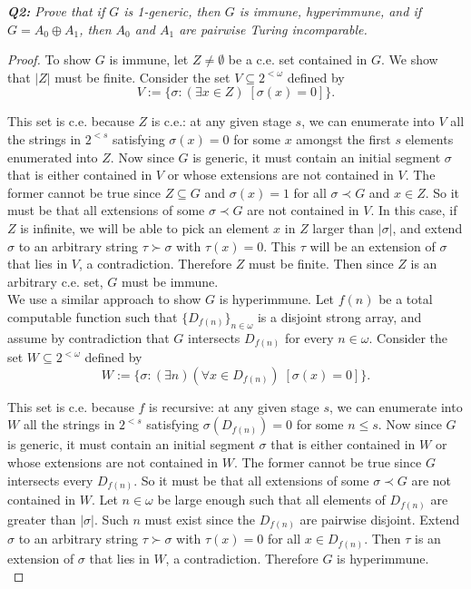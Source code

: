 \documentclass{article}
\begin{document}
\it \textbf{Q2:} Prove that if $G$ is 1-generic, then $G$ is immune,
  hyperimmune, and if $G=A_0\oplus A_1$, then $A_0$ and $A_1$ are pairwise
  Turing incomparable.

  \begin{proof}
    To show $G$ is immune, let $Z\neq\emptyset$ be a c.e. set contained in
    $G$. We show that $|Z|$ must be finite. Consider the set $V\subseteq
    2^{<\omega}$ defined by
    \[V:= \{\sigma: (\exists x\in Z)\; [\sigma(x)=0]\}.\]

    This set is c.e. because $Z$ is c.e.: at any given stage $s$, we can
    enumerate into $V$ all the strings in $2^{<s}$ satisfying $\sigma(x)=0$
    for some $x$ amongst the first $s$ elements enumerated into $Z$. Now
    since $G$ is generic, it must contain an initial segment $\sigma$
    that is either contained in $V$ or whose extensions are not
    contained in $V$. The former cannot be true since $Z\subseteq G$ and
    $\sigma(x)=1$ for all $\sigma\prec G$ and $x\in Z$. So it must be
    that all extensions of some $\sigma\prec G$ are not contained in $V$. In
    this case, if $Z$ is infinite, we will be able to pick an element $x$
    in $Z$ larger than $|\sigma|$, and extend $\sigma$ to an arbitrary
    string $\tau\succ\sigma$ with $\tau(x)=0$. This $\tau$ will be an
    extension of $\sigma$ that lies in $V$, a contradiction. Therefore $Z$
    must be finite. Then since $Z$ is an arbitrary c.e. set, $G$ must be
    immune. \\

    We use a similar approach to show $G$ is hyperimmune. Let $f(n)$ be a
    total computable function such that $\{D_{f(n)}\}_{n\in\omega}$ is a
    disjoint strong array, and assume by contradiction that $G$ intersects
    $D_{f(n)}$ for every $n\in\omega$. Consider the set $W\subseteq
    2^{<\omega}$ defined by
    \[W:= \{\sigma: (\exists n)(\forall x\in D_{f(n)})\;
    [\sigma(x)=0]\}.\]

    This set is c.e. because $f$ is recursive: at any given stage $s$, we
    can enumerate into $W$ all the strings in $2^{<s}$ satisfying
    $\sigma(D_{f(n)})=0$ for some $n\leq s$. Now since $G$ is generic, it
    must contain an initial segment $\sigma$ that is either contained in
    $W$ or whose extensions are not contained in $W$. The former cannot
    be true since $G$ intersects every $D_{f(n)}$. So it must be that all
    extensions of some $\sigma\prec G$ are not contained in $W$. Let
    $n\in\omega$ be large enough such that all elements of $D_{f(n)}$ are
    greater than $|\sigma|$. Such $n$ must exist since the $D_{f(n)}$ are
    pairwise disjoint. Extend $\sigma$ to an arbitrary string
    $\tau\succ\sigma$ with $\tau(x)=0$ for all $x\in D_{f(n)}$. Then $\tau$
    is an extension of $\sigma$ that lies in $W$, a contradiction.
    Therefore $G$ is hyperimmune. \\


\end{proof}
\end{document}

